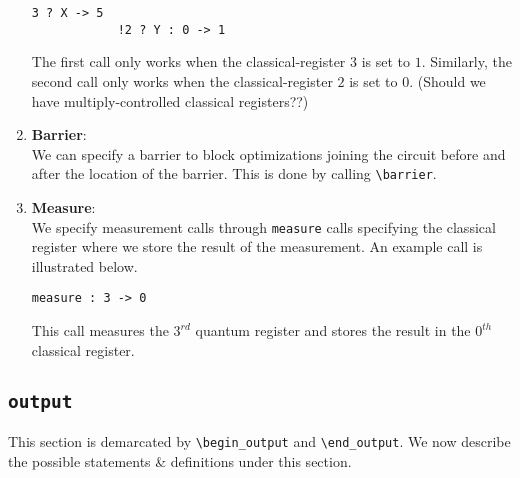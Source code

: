 \documentclass{article}
\begin{document}
\begin{enumerate}
\begin{lstlisting}[caption=Classical-Controlled Gate Calls]
			3 ? X -> 5
			!2 ? Y : 0 -> 1
		\end{lstlisting}
		The first call only works when the classical-register $3$ is set to $1$. Similarly, the second call only works when the classical-register $2$ is set to $0$. (Should we have multiply-controlled classical registers??)
	\item \textbf{Barrier}: \\
		We can specify a barrier to block optimizations joining the circuit before and after the location of the barrier. This is done by calling \texttt{\textbackslash barrier}.
	\item \textbf{Measure}: \\
		We specify measurement calls through \texttt{measure} calls specifying the classical register where we store the result of the measurement. An example call is illustrated below.
		\begin{lstlisting}[caption=Measurement]
			measure : 3 -> 0
		\end{lstlisting}
		This call measures the $3^{rd}$ quantum register and stores the result in the $0^{th}$ classical register.

\end{enumerate}

\subsection{\texttt{output}}
This section is demarcated by \texttt{\textbackslash begin\_output} and \texttt{\textbackslash end\_output}. We now describe the possible statements \& definitions under this section.
\end{document}
